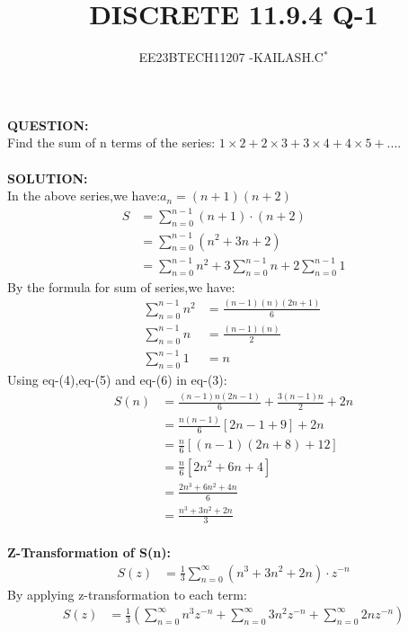 \documentclass[journal,12pt,twocolumn]{IEEEtran}
\theoremstyle{remark}
\begin{document}

\vspace{3cm}

\title{DISCRETE 11.9.4 Q-1}
\author{EE23BTECH11207 -KAILASH.C$^{*}$%
}
\maketitle
\newpage
\bigskip

\renewcommand{\thefigure}{\theenumi}
\renewcommand{\thetable}{\theenumi}


\textbf{QUESTION:}\\
Find the sum of n terms of the series:
$1\times2+2\times3+3\times4+4\times5+....$\\ \\
\textbf{SOLUTION:}\\
In the above series,we have:$a_n=(n+1)(n+2)$
\begin{align}
     S&=\sum_{n=0}^{n-1} (n+1) \cdot (n+2)\\
     &=\sum_{n=0}^{n-1} (n^2 + 3n + 2)\\
     &=\sum_{n=0}^{n-1} n^2+3\sum_{n=0}^{n-1} n+2 \sum_{n=0}^{n-1} 1
\end{align}
By the formula for sum of series,we have:
\begin{align}
    \sum_{n=0}^{n-1} n^2&=\frac{(n-1)(n)(2n+1)}{6}\ \\
    \sum_{n=0}^{n-1} n&=\frac{(n-1)(n)}{2}\\
    \sum_{n=0}^{n-1} 1&=n
\end{align}
Using eq-(4),eq-(5) and eq-(6) in eq-(3):
\begin{align}
    S(n)&=\frac{(n-1)n(2n-1)}{6} + \frac{3(n-1)n}{2} + 2n \\
    &=\frac{n(n-1)}{6}[2n-1+9]+2n\\
    &=\frac{n}{6}[(n-1)(2n+8)+12]\\
    &=\frac{n}{6}[2n^2+6n+4]\\
    &=\frac{2n^3+6n^2+4n}{6}\\
    &=\frac{n^3+3n^2+2n}{3}
\end{align}\\
\textbf{Z-Transformation of S(n):}\\
\begin{align}
S(z)&=\frac{1}{3} \sum_{n=0}^{\infty} (n^3 + 3n^2 + 2n) \cdot z^{-n}
\end{align}
By applying z-transformation to each term:
\begin{align}
    S(z)&=\frac{1}{3}\left(\sum_{n=0}^{\infty}n^3 z^{-n}+\sum_{n=0}^{\infty}3n^2z^{-n}+\sum_{n=0}^{\infty}2nz^{-n}\right)
\end{align}
\end{document}
